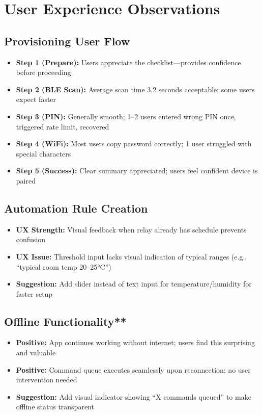 \section{User Experience Observations}

\subsection{Provisioning User Flow}

\begin{itemize}
    \item \textbf{Step 1 (Prepare):} Users appreciate the checklist—provides confidence before proceeding
    \item \textbf{Step 2 (BLE Scan):} Average scan time 3.2 seconds acceptable; some users expect faster
    \item \textbf{Step 3 (PIN):} Generally smooth; 1–2 users entered wrong PIN once, triggered rate limit, recovered
    \item \textbf{Step 4 (WiFi):} Most users copy password correctly; 1 user struggled with special characters
    \item \textbf{Step 5 (Success):} Clear summary appreciated; users feel confident device is paired
\end{itemize}

\subsection{Automation Rule Creation}

\begin{itemize}
    \item \textbf{UX Strength:} Visual feedback when relay already has schedule prevents confusion
    \item \textbf{UX Issue:} Threshold input lacks visual indication of typical ranges (e.g., ``typical room temp 20–25°C'')
    \item \textbf{Suggestion:} Add slider instead of text input for temperature/humidity for faster setup
\end{itemize}

\subsection{Offline Functionality**}

\begin{itemize}
    \item \textbf{Positive:} App continues working without internet; users find this surprising and valuable
    \item \textbf{Positive:} Command queue executes seamlessly upon reconnection; no user intervention needed
    \item \textbf{Suggestion:} Add visual indicator showing ``X commands queued'' to make offline status transparent
\end{itemize}

